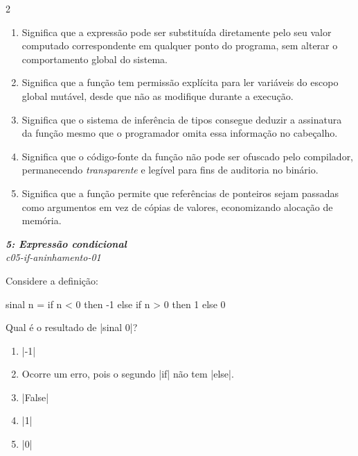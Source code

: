 \documentclass[a4paper,10pt,brazil]{article}
\begin{document}
\begin{multicols}{2}
\begin{enumerate}
  \item Significa que a expressão pode ser substituída diretamente pelo seu valor computado correspondente em qualquer ponto do programa, sem alterar o comportamento global do sistema.

  \item Significa que a função tem permissão explícita para ler variáveis do escopo global mutável, desde que não as modifique durante a execução.

  \item Significa que o sistema de inferência de tipos consegue deduzir a assinatura da função mesmo que o programador omita essa informação no cabeçalho.

  \item Significa que o código-fonte da função não pode ser ofuscado pelo compilador, permanecendo \emph{transparente} e legível para fins de auditoria no binário.

  \item Significa que a função permite que referências de ponteiros sejam passadas como argumentos em vez de cópias de valores, economizando alocação de memória.


\end{enumerate}

\begin{flushright}
  \footnotesize
  \textit{\textbf{5: Expressão condicional}}\\
  \textit{c05-if-aninhamento-01}\\

\end{flushright}
Considere a definição:
\begin{haskellcode}
sinal n = if n < 0 then -1 else if n > 0 then 1 else 0
\end{haskellcode}
Qual é o resultado de \haskellinline|sinal 0|?

\begin{enumerate}
  \item \haskellinline|-1|

  \item Ocorre um erro, pois o segundo \haskellinline|if| não tem \haskellinline|else|.

  \item \haskellinline|False|

  \item \haskellinline|1|

  \item \haskellinline|0|



\end{enumerate}
\end{multicols}
\end{document}
